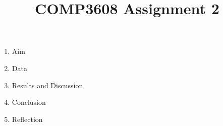 \documentclass[a4paper, 12pt]{article}
\begin{document}
\title{COMP3608 Assignment 2}
\maketitle

\begin{enumerate}
    \item Aim
    \item Data
    \item Results and Discussion
    \item Conclusion
    \item Reflection
\end{enumerate}
\end{document}
